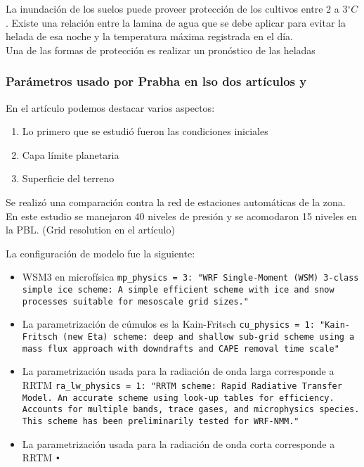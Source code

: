 \documentclass[11pt]{article}
\def\celc{$^{\circ}C$ }%
\begin{document}
La inundación de los suelos puede proveer protección de los cultivos entre 2 a 3\celc. Existe una relación entre la lamina de agua que se debe aplicar para evitar la helada de esa noche y la temperatura máxima registrada en el día.\\

Una de las formas de protección es realizar un pronóstico de las heladas

\subsubsection{Parámetros usado por Prabha en lso dos artículos \citep{prabha2008} y \citep{prabha2008evaluation}}


En el artículo \citet{prabha2008} podemos destacar varios aspectos:

\begin{enumerate}
\item Lo primero que se estudió fueron las condiciones iniciales
\item Capa límite planetaria
\item Superficie del terreno
\end{enumerate}

Se realizó una comparación contra la red de estaciones automáticas de la zona. En este estudio se manejaron 40 niveles de presión y se acomodaron 15 niveles en la PBL. (Grid resolution en el artículo)


La configuración de modelo fue la siguiente:

\begin{itemize}
\item WSM3 en microfísica \texttt{mp\_physics = 3: "WRF Single-Moment (WSM) 3-class simple ice scheme: A simple efficient scheme with ice and snow processes suitable for mesoscale grid sizes."}
\item La parametrización de cúmulos es la Kain-Fritsch \texttt{cu\_physics = 1: "Kain-Fritsch (new Eta) scheme: deep and shallow sub-grid scheme using a mass flux approach with downdrafts and CAPE removal time scale"}

\item La parametrización usada para la radiación de onda larga corresponde a RRTM \texttt{ra\_lw\_physics = 1: "RRTM scheme: Rapid Radiative Transfer Model. An accurate scheme using look-up tables for efficiency. Accounts for multiple bands, trace gases, and microphysics species. This scheme has been preliminarily tested for WRF-NMM."}

\item La parametrización usada para la radiación de onda corta corresponde a RRTM \texttt{•}
\end{itemize}
\end{document}

